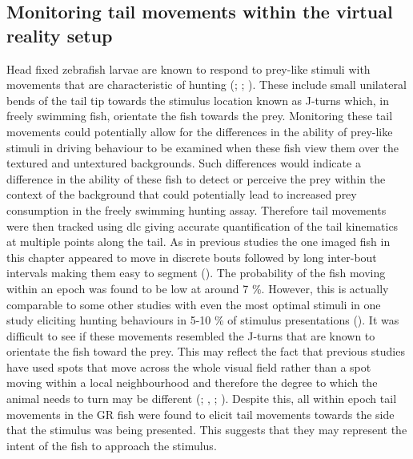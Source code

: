 \subsection{Monitoring tail movements within the virtual reality setup}
Head fixed zebrafish larvae are known to respond to prey-like stimuli with movements that are characteristic of hunting (\cite{Bianco2011}; \cite{Bianco2015}; \cite{Semmelhack2014}). These include small unilateral bends of the tail tip towards the stimulus location known as J-turns which, in freely swimming fish, orientate the fish towards the prey. Monitoring these tail movements could potentially allow for the differences in the ability of prey-like stimuli in driving behaviour to be examined when these fish view them over the textured and untextured backgrounds. Such differences would indicate a difference in the ability of these fish to detect or perceive the prey within the context of the background that could potentially lead to increased prey consumption in the freely swimming hunting assay. Therefore tail movements were then tracked using \gls{dlc} giving accurate quantification of the tail kinematics at multiple points along the tail. As in previous studies the one imaged fish in this chapter appeared to move in discrete bouts followed by long inter-bout intervals making them easy to segment (\cite{Semmelhack2014}).  The probability of the fish moving within an epoch was found to be low at around 7 \%. However, this is actually comparable to some other studies with even the most optimal stimuli in one study eliciting hunting behaviours in  5-10 \% of stimulus presentations (\cite{Bianco2015}). It was difficult to see if these movements resembled the J-turns that are known to orientate the fish toward the prey. This may reflect the fact that previous studies have used spots that move across the whole visual field rather than a spot moving within a local neighbourhood and therefore the degree to which the animal needs to turn may be different (\cite{Bianco2011}; \cite{Bianco2015}, \cite{Semmelhack2014}; \cite{Jouary2016ALarvae}). Despite this, all within epoch tail movements in the GR fish were found to elicit tail movements towards the side that the stimulus was being presented. This suggests that they may represent the intent of the fish to approach the stimulus. 

